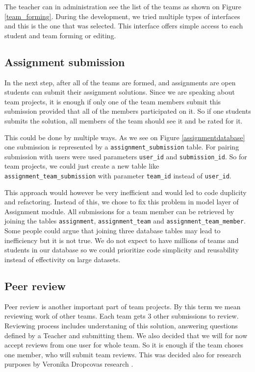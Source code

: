 The teacher can in administration see the list of the teams as shown on Figure \ref{team_forming}. During the development, we tried multiple types of interfaces and this is the one that was selected. This interface offers simple access to each student and team forming or editing.


\subsection{Assignment submission}
In the next step, after all of the teams are formed, and assignments are open students can submit their assignment solutions. Since we are speaking about team projects, it is enough if only one of the team members submit this submission provided that all of the members participated on it. So if one students submits the solution, all members of the team should see it and be rated for it.

This could be done by multiple ways. As we see on Figure \ref{assignmentdatabase} one submission is represented by a \texttt{assignment\_submission} table. For pairing submission with users were used parameters \texttt{user\_id} and \texttt{submission\_id}. So for team projects, we could just create a new table like \texttt{assignment\_team\_submission} with parameter \texttt{team\_id} instead of \texttt{user\_id}.

This approach would however be very inefficient and would led to code duplicity and refactoring. Instead of this, we chose to fix this problem in model layer of Assignment module. All submissions for a team member can be retrieved by joining the tables  \texttt{assignment}, \texttt{assignment\_team} and \texttt{assignment\_team\_member}. Some people could argue that joining three database tables may lead to inefficiency but it is not true. We do not expect to have millions of teams and students in our database so we could prioritize code simplicity and reusability instead of effectivity on large datasets.

\subsection{Peer review}
\label{sec:peerreview}
Peer review is another important part of team projects. By this term we mean reviewing work of other teams. Each team gets 3 other submissions to review. Reviewing process includes understaning of this solution, answering questions defined by a Teacher and submitting them. We also decided that we will for now accept reviews from one user for whole team. So it is enough if the team choses one member, who will submit team reviews. This was decided also for research purposes by Veronika Dropcovas research \cite{dropcova}. 

